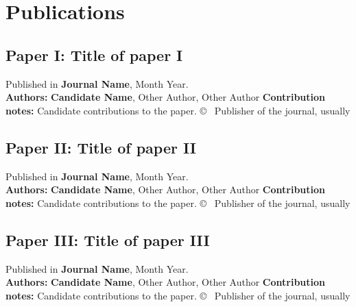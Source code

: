 \chapter*{Publications}


\newpage
\section*{Paper I: Title of paper I}
\centering
Published in \textbf{Journal Name}, Month Year.\\
\vspace{30pt}
\vspace{10pt}
\RaggedRight
\textbf{Authors:} \textbf{Candidate Name}, Other Author, Other Author
\vspace{30pt}
\justify
\textbf{Contribution notes:} Candidate contributions to the paper.
\vfill
\copyright~ 
\footnotesize{Publisher of the journal, usually}
\newpage
%

\newpage
\section*{Paper II: Title of paper II}
\centering
Published in \textbf{Journal Name}, Month Year.\\
\vspace{30pt}
\vspace{10pt}
\RaggedRight
\textbf{Authors:} \textbf{Candidate Name}, Other Author, Other Author
\vspace{30pt}
\justify
\textbf{Contribution notes:} Candidate contributions to the paper.
\vfill
\copyright~ 
\footnotesize{Publisher of the journal, usually}
\newpage
%
%

\newpage
\section*{Paper III: Title of paper III}
\centering
Published in \textbf{Journal Name}, Month Year.\\
\vspace{30pt}
\vspace{10pt}
\RaggedRight
\textbf{Authors:} \textbf{Candidate Name}, Other Author, Other Author
\vspace{30pt}
\justify
\textbf{Contribution notes:} Candidate contributions to the paper.
\vfill
\copyright~ 
\footnotesize{Publisher of the journal, usually}
\newpage
%